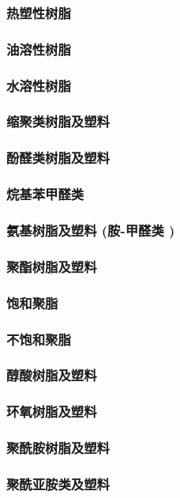 \documentclass[UTF8]{../../ApplicationUniverse}
\begin{document}
        \subsubsection{热塑性树脂}
        \subsubsection{油溶性树脂}
        \subsubsection{水溶性树脂}
\subsubsection{缩聚类树脂及塑料}
    \subsubsection{酚醛类树脂及塑料}
    \subsubsection{烷基苯甲醛类}
    \subsubsection{氨基树脂及塑料 (胺-甲醛类 )}
    \subsubsection{聚酯树脂及塑料}
        \subsubsection{饱和聚脂}
        \subsubsection{不饱和聚脂}
        \subsubsection{醇酸树脂及塑料}
    \subsubsection{环氧树脂及塑料}
    \subsubsection{聚酰胺树脂及塑料}
    \subsubsection{聚酰亚胺类及塑料}
\end{document}
